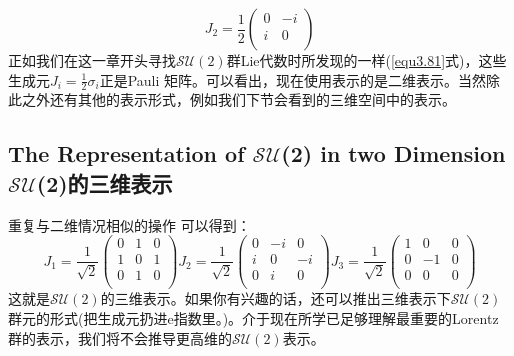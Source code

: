 \begin{equation}\label{equ3.120}
    J_2=\frac{1}{2}\left(
                   \begin{array}{cc}
                     0 & -i \\
                     i & 0 \\
                   \end{array}
                 \right)
\end{equation}
正如我们在这一章开头寻找$\mathcal{SU}(2)$群Lie代数时所发现的一样(\ref{equ3.81}式)，这些生成元$J_i=\frac{1}{2}\sigma_i$正是Pauli 矩阵。可以看出，现在使用表示的是二维表示。当然除此之外还有其他的表示形式，例如我们下节会看到的三维空间中的表示。
\subsection[$\mathcal{SU}$(2)的三维表示]{The Representation of $\mathcal{SU}$(2) in two Dimension $\mathcal{SU}$(2)的三维表示}
\label{equ3.6.5}
重复与二维情况相似的操作 可以得到：
\begin{equation}\label{equ3.121}
J_1=\frac{1}{\sqrt{2}}\left(
\begin{array}{ccc}
0& 1 & 0 \\
1 & 0 & 1 \\
0 & 1 & 0 \\
  \end{array}
\right)
J_2=\frac{1}{\sqrt{2}}\left(
\begin{array}{ccc}
0& -i & 0 \\
i & 0 & -i \\
0 & i & 0 \\
\end{array}
\right)
J_3=\frac{1}{\sqrt{2}}\left(
\begin{array}{ccc}
1& 0 & 0 \\
0 & -1 & 0 \\
0 & 0 & 0 \\
\end{array}
\right)
\end{equation}
这就是$\mathcal{SU}(2)$的三维表示。如果你有兴趣的话，还可以推出三维表示下$\mathcal{SU}(2)$群元的形式(把生成元扔进$\mathrm{e}$指数里。)。介于现在所学已足够理解最重要的Lorentz 群的表示，我们将不会推导更高维的$\mathcal{SU}(2)$表示。




